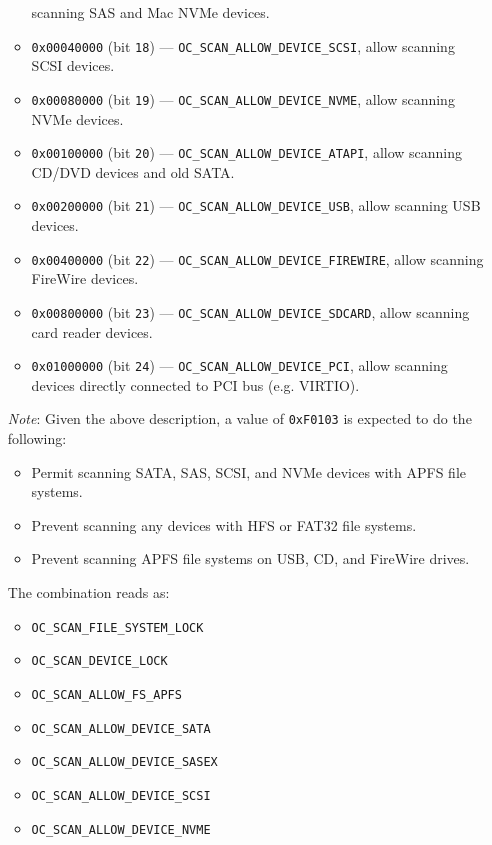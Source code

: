 \documentclass[]{article}
\providecommand{\tightlist}{%
  \setlength{\itemsep}{0pt}\setlength{\parskip}{0pt}}
\begin{document}
\begin{enumerate}
\begin{itemize}
    scanning SAS and Mac NVMe devices.
    \item \texttt{0x00040000} (bit \texttt{18}) --- \texttt{OC\_SCAN\_ALLOW\_DEVICE\_SCSI}, allow
    scanning SCSI devices.
    \item \texttt{0x00080000} (bit \texttt{19}) --- \texttt{OC\_SCAN\_ALLOW\_DEVICE\_NVME}, allow
    scanning NVMe devices.
    \item \texttt{0x00100000} (bit \texttt{20}) --- \texttt{OC\_SCAN\_ALLOW\_DEVICE\_ATAPI}, allow
    scanning CD/DVD devices and old SATA.
    \item \texttt{0x00200000} (bit \texttt{21}) --- \texttt{OC\_SCAN\_ALLOW\_DEVICE\_USB}, allow
    scanning USB devices.
    \item \texttt{0x00400000} (bit \texttt{22}) --- \texttt{OC\_SCAN\_ALLOW\_DEVICE\_FIREWIRE}, allow
    scanning FireWire devices.
    \item \texttt{0x00800000} (bit \texttt{23}) --- \texttt{OC\_SCAN\_ALLOW\_DEVICE\_SDCARD}, allow
    scanning card reader devices.
    \item \texttt{0x01000000} (bit \texttt{24}) --- \texttt{OC\_SCAN\_ALLOW\_DEVICE\_PCI}, allow
    scanning devices directly connected to PCI bus (e.g. VIRTIO).
  \end{itemize}

  \emph{Note}: Given the above description, a value of \texttt{0xF0103} is expected to do the following:

  \begin{itemize}
  \tightlist
  \item Permit scanning SATA, SAS, SCSI, and NVMe devices with APFS file systems.
  \item Prevent scanning any devices with HFS or FAT32 file systems.
  \item Prevent scanning APFS file systems on USB, CD, and FireWire drives.
  \end{itemize}

  The combination reads as:
  \begin{itemize}
  \tightlist
  \item \texttt{OC\_SCAN\_FILE\_SYSTEM\_LOCK}
  \item \texttt{OC\_SCAN\_DEVICE\_LOCK}
  \item \texttt{OC\_SCAN\_ALLOW\_FS\_APFS}
  \item \texttt{OC\_SCAN\_ALLOW\_DEVICE\_SATA}
  \item \texttt{OC\_SCAN\_ALLOW\_DEVICE\_SASEX}
  \item \texttt{OC\_SCAN\_ALLOW\_DEVICE\_SCSI}
  \item \texttt{OC\_SCAN\_ALLOW\_DEVICE\_NVME}
  \end{itemize}


\end{enumerate}
\end{document}
